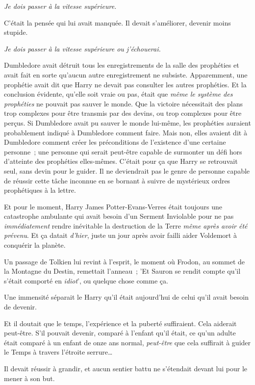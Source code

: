 \emph{Je dois passer à la vitesse supérieure.}

C'était la pensée qui lui avait manquée. Il devait s'améliorer, devenir moins stupide.

\emph{Je dois passer à la vitesse supérieure ou j'échouerai.}

Dumbledore avait détruit tous les enregistrements de la salle des prophéties et avait fait en sorte qu'aucun autre enregistrement ne subsiste. Apparemment, une prophétie avait dit que Harry ne devait pas consulter les autres prophéties. Et la conclusion évidente, qu'elle soit vraie ou pas, était que \emph{même le système des prophéties} ne pouvait pas sauver le monde. Que la victoire nécessitait des plans trop complexes pour être transmis par des devins, ou trop complexes pour être perçus. Si Dumbledore avait pu sauver le monde lui-même, les prophéties auraient probablement indiqué à Dumbledore comment faire. Mais non, elles avaient dit à Dumbledore comment créer les préconditions de l'existence d'une certaine personne~; une personne qui serait peut-être capable de surmonter un défi hors d'atteinte des prophéties elles-mêmes. C'était pour ça que Harry se retrouvait seul, sans devin pour le guider. Il ne deviendrait pas le genre de personne capable de réussir cette tâche inconnue en se bornant à suivre de mystérieux ordres prophétiques à la lettre.

Et pour le moment, Harry James Potter-Evans-Verres était toujours une catastrophe ambulante qui avait besoin d'un Serment Inviolable pour ne pas \emph{immédiatement} rendre inévitable la destruction de la Terre \emph{même après avoir été prévenu}. Et ça datait \emph{d'hier}, juste un jour après avoir failli aider Voldemort à conquérir la planète.

Un passage de Tolkien lui revint à l'esprit, le moment où Frodon, au sommet de la Montagne du Destin, remettait l'anneau~; 'Et Sauron se rendit compte qu'il s'était comporté en \emph{idiot}', ou quelque chose comme ça.

Une immensité séparait le Harry qu'il était aujourd'hui de celui qu'il avait besoin de devenir.

Et il doutait que le temps, l'expérience et la puberté suffiraient. Cela aiderait peut-être. S'il pouvait devenir, comparé à l'enfant qu'il était, ce qu'un adulte était comparé à un enfant de onze ans normal, \emph{peut-être} que cela suffirait à guider le Temps à travers l'étroite serrure…

Il devait réussir à grandir, et aucun sentier battu ne s'étendait devant lui pour le mener à son but.

